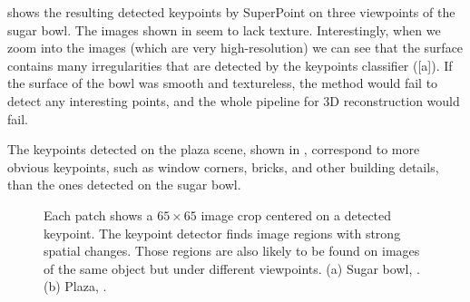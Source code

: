 \Fig{\ref{fig:sfm:keypoints_sugar}} shows the resulting detected keypoints by SuperPoint on three viewpoints of the sugar bowl.
The images shown in \fig{\ref{fig:sfm:sugar}} seem to lack texture. Interestingly, when we zoom into the images (which are very high-resolution) we can see that the surface contains many irregularities that are detected by the keypoints classifier (\fig{\ref{fig:sfm:sugar_keypoints_examples_many}}[a]). If the surface of the bowl was smooth and  textureless, the method would fail to detect any interesting points, and the whole pipeline for 3D reconstruction would fail.

The keypoints detected on the plaza scene, shown in , correspond to more obvious keypoints, such as window corners, bricks, and other building details, than the ones detected on the sugar bowl.

\begin{figure}[t]
\caption{Each patch shows a $65 \times 65$ image crop centered on a detected keypoint. The keypoint detector finds image regions with strong spatial changes. Those regions are also likely to be found on images of the same object but under different viewpoints. (a) Sugar bowl, \fig{\ref{fig:sfm:sugar}}. (b) Plaza, \fig{\ref{fig:sfm:palma}}.}
\label{fig:sfm:sugar_keypoints_examples_many}
\end{figure}






